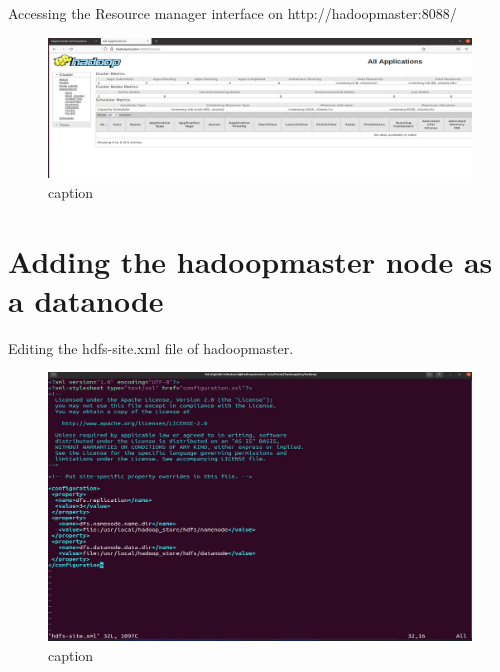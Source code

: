 \begin{spacing}{1.2}
\par Accessing the Resource manager interface on http://hadoopmaster:8088/
\\
\begin{figure}[!htb] 
\begin{center} 
\includegraphics[width=1\linewidth]{Big_Data/Hadoop/Multi-Nodes Cluster/Ressource manager interface.jpg} 
\end{center} 
\caption{caption} 
\end{figure} 
\FloatBarrier

\section{Adding the hadoopmaster node as a datanode }

\par Editing the hdfs-site.xml file of hadoopmaster.
\\
\begin{figure}[!htb] 
\begin{center} 
\includegraphics[width=1\linewidth]{Big_Data/Hadoop/Multi-Nodes Cluster/adding hadoopmaster as datanode.jpg} 
\end{center} 
\caption{caption} 
\end{figure} 
\FloatBarrier



\end{spacing}
